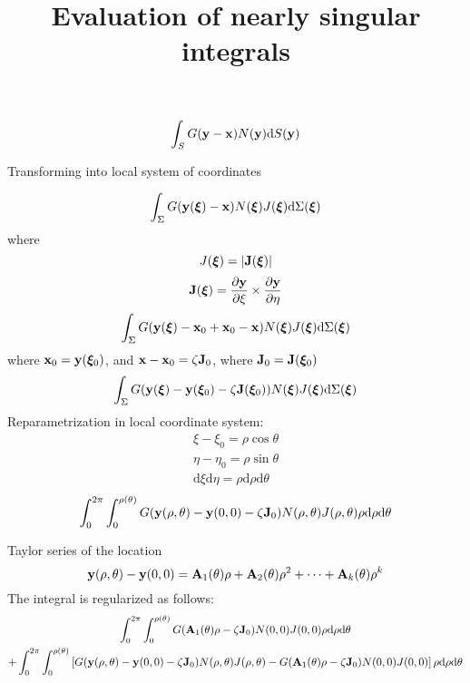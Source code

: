 \documentclass{article}
\title{Evaluation of nearly singular integrals}
\newcommand{\td}{\mathrm{d}}
\begin{document}
\begin{equation}
	\int_{S} G({\bf y} - {\bf x}) N({\bf y}) \td S({\bf y})
\end{equation}

Transforming into local system of coordinates

\begin{equation}
	\int_{\Sigma} G({\bf y(\bm{\xi})} - {\bf x}) N(\bm{\xi}) J(\bm{\xi}) \td \Sigma(\bm{\xi})
\end{equation}
%
where
%
\begin{equation}
	J({\bm{\xi}}) = |\bf{J}(\bm{\xi})|
\end{equation}
%
\begin{equation}
	{\bf J}(\bm{\xi}) = \frac{\partial {\bf y}}{\partial \xi} \times \frac{\partial {\bf y}}{\partial \eta}
\end{equation}
%
\begin{equation}
	\int_{\Sigma} G({\bf y(\bm{\xi})} - {\bf x}_0 + {\bf x}_0 - {\bf x}) N(\bm{\xi}) J(\bm{\xi}) \td \Sigma(\bm{\xi})
\end{equation}
%
where ${\bf x}_0 = {\bf y}(\bm{\xi}_0)$,
and ${\bf x} - {\bf x}_0 = \zeta {\bf J}_0$, 
where ${\bf J}_0 = {\bf J}({\bm{\xi}_0})$
%
\begin{equation}
	\int_{\Sigma}
	G({\bf y(\bm{\xi})} - {\bf y}(\bm{\xi}_0) - \zeta {\bf J}({\bm{\xi}_0})) N(\bm{\xi}) J(\bm{\xi}) \td \Sigma(\bm{\xi})
\end{equation}
%
Reparametrization in local coordinate system:
%
\begin{align}
	\xi - \xi_0 = \rho \cos \theta \\
	\eta - \eta_0 = \rho \sin \theta \\
	\td\xi \td \eta = \rho \td \rho \td \theta
\end{align}
%
\begin{equation}
	\int_{0}^{2\pi}
	\int_{0}^{\rho(\theta)}
	G({\bf y}(\rho, \theta) - {\bf y}(0, 0) - \zeta {\bf J}_0)
	N(\rho, \theta)
	J(\rho, \theta)
	\rho
	\td \rho
	\td \theta
\end{equation}

Taylor series of the location
%
\begin{equation}
{\bf y}(\rho, \theta) - {\bf y}(0, 0) = {\bf A}_1(\theta) \rho + {\bf A}_2(\theta) \rho^2 + \dots + {\bf A}_k(\theta) \rho^k
\end{equation}
%
The integral is regularized as follows:
%
\begin{multline}
	\int_{0}^{2\pi}
	\int_{0}^{\rho(\theta)}
		G({\bf A}_1(\theta) \rho - \zeta {\bf J}_0)
		N(0, 0)
		J(0, 0)
	\rho
	\td \rho
	\td \theta \\
	+
	\int_{0}^{2\pi}
	\int_{0}^{\rho(\theta)}
	\left[
		G({\bf y}(\rho, \theta) - {\bf y}(0, 0) - \zeta {\bf J}_0)
		N(\rho, \theta)
		J(\rho, \theta)
		-
		G({\bf A}_1(\theta) \rho - \zeta {\bf J}_0)
		N(0, 0)
		J(0, 0)
	\right]
	\rho
	\td \rho
	\td \theta
\end{multline}
\end{document}
